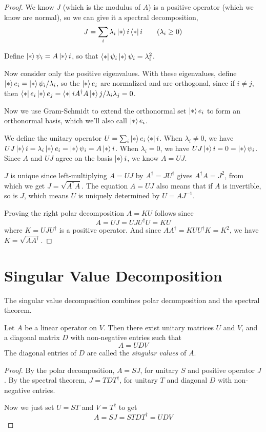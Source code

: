 \begin{proof}
We know $J$ (which is the modulus of $A$) is a positive operator (which we know are normal), so we can give it a spectral decomposition, 
$$J = \sum_{i} \lambda_{i} \ket*{i} \bra*{i} \qquad (\lambda_{i} \geq 0)$$

Define $\ket*{\psi_{i}} = A \ket*{i}$, so that $\bra*{\psi_{i}}\ket*{\psi_{i}} = \lambda_{i}^{2}$. 

Now consider only the positive eigenvalues. With these eigenvalues, define $\ket*{e_{i}} = \ket*{\psi_{i}} / \lambda_{i}$, so the $\ket*{e_{i}}$ are normalized and are orthogonal, since if $i \neq j$, then $\bra*{e_{i}}\ket*{e_{j}} = \bra*{i}A^{\dagger}A\ket*{j} / \lambda_{i} \lambda_{j} = 0$. 

Now we use Gram-Schmidt to extend the orthonormal set $\ket*{e_{i}}$ to form an orthonormal basis, which we'll also call $\ket*{e_{i}}$. 

We define the unitary operator $U = \sum_{i} \ket*{e_{i}} \bra*{i}$. When $\lambda_{i} \neq 0$, we have $UJ\ket*{i} = \lambda_{i} \ket*{e_{i}} = \ket*{\psi_{i}} = A \ket*{i}$. When $\lambda_{i} = 0$, we have $UJ \ket*{i} = 0 = \ket*{\psi_{i}}$. Since $A$ and $UJ$ agree on the basis $\ket*{i}$, we know $A = UJ$. 

$J$ is unique since left-multiplying $A = UJ$ by $A^{\dagger} = JU^{\dagger}$ gives $A^{\dagger}A = J^{2}$, from which we get $J = \sqrt{A^{\dagger}A}$. The equation $A = UJ$ also means that if $A$ is invertible, so is $J$, which means $U$ is uniquely determined by $U = AJ^{-1}$. 

Proving the right polar decomposition $A = KU$ follows since $$A = UJ = UJU^{\dagger}U = KU$$
where $K = UJU^{\dagger}$ is a positive operator. And since $AA^{\dagger} = KUU^{\dagger}K = K^{2}$, we have $K = \sqrt{AA^{\dagger}}$. 
\end{proof} 

\section{Singular Value Decomposition} 

The singular value decomposition combines polar decomposition and the spectral theorem. 

\begin{theorem}
Let $A$ be a linear operator on $V$. Then there exist unitary matrices $U$ and $V$, and a diagonal matrix $D$ with non-negative entries such that $$A = UDV$$
The diagonal entries of $D$ are called the \textit{singular values} of $A$. 
\end{theorem}

\begin{proof}
By the polar decomposition, $A = SJ$, for unitary $S$ and positive operator $J$. By the spectral theorem, $J = TDT^{\dagger}$, for unitary $T$ and diagonal $D$ with non-negative entries. 

Now we just set $U = ST$ and $V = T^{\dagger}$ to get 
$$A = SJ = STDT^{\dagger} = UDV$$
\end{proof}
